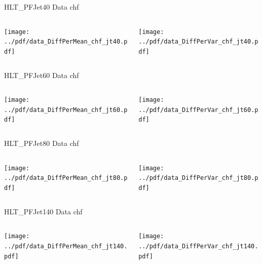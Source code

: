 \documentclass[9pt]{beamer}
\begin{document}
\begin{frame}[t]{HLT\_PFJet40 Data chf}
\begin{columns}[T]
  \begin{column}{.5\textwidth}
  \texttt{[image: ../pdf/data\_DiffPerMean\_chf\_jt40.pdf]}
  \end{column}
  \begin{column}{.5\textwidth}
  \texttt{[image: ../pdf/data\_DiffPerVar\_chf\_jt40.pdf]}
  \end{column}
\end{columns}
\end{frame}

\begin{frame}[t]{HLT\_PFJet60 Data chf}
\begin{columns}[T]
  \begin{column}{.5\textwidth}
  \texttt{[image: ../pdf/data\_DiffPerMean\_chf\_jt60.pdf]}
  \end{column}
  \begin{column}{.5\textwidth}
  \texttt{[image: ../pdf/data\_DiffPerVar\_chf\_jt60.pdf]}
  \end{column}
\end{columns}
\end{frame}

\begin{frame}[t]{HLT\_PFJet80 Data chf}
\begin{columns}[T]
  \begin{column}{.5\textwidth}
  \texttt{[image: ../pdf/data\_DiffPerMean\_chf\_jt80.pdf]}
  \end{column}
  \begin{column}{.5\textwidth}
  \texttt{[image: ../pdf/data\_DiffPerVar\_chf\_jt80.pdf]}
  \end{column}
\end{columns}
\end{frame}

\begin{frame}[t]{HLT\_PFJet140 Data chf}
\begin{columns}[T]
  \begin{column}{.5\textwidth}
  \texttt{[image: ../pdf/data\_DiffPerMean\_chf\_jt140.pdf]}
  \end{column}
  \begin{column}{.5\textwidth}
  \texttt{[image: ../pdf/data\_DiffPerVar\_chf\_jt140.pdf]}
  \end{column}
\end{columns}
\end{frame}
\end{document}
